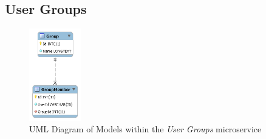 \subsection{User Groups}
\begin{figure}[H]
    \centering
    \includegraphics[width=0.2\textwidth]{Images/db_uml/user-groups.png}
    \caption{UML Diagram of Models within the \textit{User Groups} microservice}
    \label{fig:db_uml:user-groups}
\end{figure}